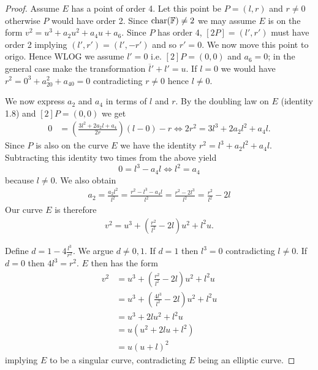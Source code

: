 \begin{proof}
Assume $E$ has a point of order 4. Let this point be $P=(l,r)$ and $r\neq 0$ otherwise $P$ would have order 2. Since $\text{char}(\mathbb{F})\neq 2$ we may assume $E$ is on the form $v^2=u^3+a_2u^2+a_4u+a_6$. Since $P$ has order 4, $[2P]=(l',r')$ must have order 2 implying $(l',r')=(l',-r')$ and so $r'=0$. We now move this point to origo. Hence WLOG we assume $l'=0$ i.e. $[2]P=(0,0)$ and $a_6=0$; in the general case make the transformation $\overline{l}'+l'=u$. If $l=0$ we would have $r^2=0^3+a_20^2+a_40=0$ contradicting $r\neq 0$ hence $l\neq 0$.

We now express $a_2$ and $a_4$ in terms of $l$ and $r$. By the doubling law on $E$ (identity 1.8) and $[2]P=(0,0)$ we get 
\begin{align*}
	0 &= \left(\frac{3l^2+2a_2l+a_4}{2r}\right)\left(l-0\right)-r \Leftrightarrow 2r^2=3l^3+2a_2l^2+a_4l.
\end{align*}
Since $P$ is also on the curve $E$ we have the identity $r^2=l^3+a_2l^2+a_4l$. Subtracting this identity two times from the above yield
\[
	0 = l^3-a_4l \Leftrightarrow l^2=a_4
\]
because $l\neq 0$. We also obtain
\begin{align*}
	a_2 = \frac{a_2l^2}{l^2} = \frac{r^2-l^3-a_4l}{l^2} = \frac{r^2-2l^3}{l^2} = \frac{r^2}{l^2}-2l
\end{align*}
Our curve $E$ is therefore 
\begin{align}\label{identity:curve}
v^2=u^3+\left(\frac{r^2}{l^2}-2l\right)u^2+l^2u.
\end{align} 

Define $d=1-4\frac{l^3}{r^2}$. We argue $d\neq 0,1$. If $d=1$ then $l^3=0$ contradicting $l\neq 0$. If $d=0$ then $4l^3=r^2$. $E$ then has the form
\begin{align*}
	v^2 &= u^3+\left(\frac{r^2}{l^2}-2l\right)u^2+l^2u \\
		&= u^3+\left(\frac{4l^3}{l^2}-2l\right)u^2+l^2u \\
		&= u^3+2lu^2+l^2u \\
		&= u(u^2+2lu+l^2) \\
		&= u(u+l)^2
\end{align*}
implying $E$ to be a singular curve, contradicting $E$ being an elliptic curve. 


\end{proof}
